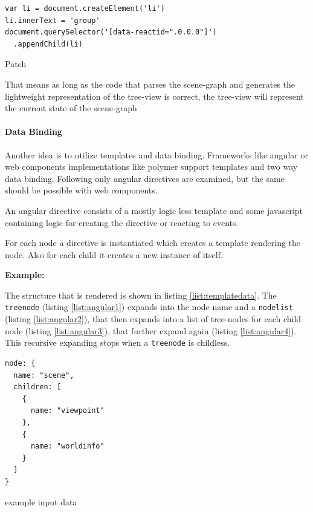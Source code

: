 \begin{listing}[H]
  \begin{verbatim}
var li = document.createElement('li')
li.innerText = 'group'
document.querySelector('[data-reactid=".0.0.0"]')
  .appendChild(li)
  \end{verbatim}
  \caption{Patch}
  \label{patch}
\end{listing}

That means as long as the code that parses the scene-graph and generates the
lightweight representation of the tree-view is correct, the tree-view will
represent the current state of the scene-graph

\paragraph{Data Binding}
\label{data-binding}

Another idea is to utilize templates and data binding. Frameworks like
angular or web components implementations like polymer
support templates and two way data binding. Following only
angular directives are examined, but the same should be possible with web
components.

An angular directive consists of a mostly logic less template and some
javascript containing logic for creating the directive or reacting to
events.

For each node a directive is instantiated which creates a template
rendering the node. Also for each child it creates a new instance of
itself.

\textbf{Example:}

The structure that is rendered is shown in listing \ref{list:templatedata}. The
\texttt{treenode} (listing \ref{list:angular1}) expands into the node name and a
\texttt{nodelist} (listing \ref{list:angular2}), that then expands into a list
of tree-nodes for each child node (listing \ref{list:angular3}), that further
expand again (listing \ref{list:angular4}). This recursive expanding stops when a
\texttt{treenode} is childless.

\begin{listing}[H]
  \begin{verbatim}
node: {
  name: "scene",
  children: [
    {
      name: "viewpoint"
    },
    {
      name: "worldinfo"
    }
  ]
}
  \end{verbatim}
  \caption{example input data}
  \label{list:templatedata}
\end{listing}

